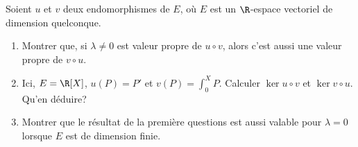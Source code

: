 \begin{enonce}
\begin{exercise}[ID={RMS133 E1283},subtitle={IMT MP 2022},tags={},difficulty={}]
Soient $u$ et $v$ deux endomorphismes de $E$, où $E$ est un $\R$-espace vectoriel de dimension quelconque.
\begin{enumerate}
  \item Montrer que, si $\lambda\neq 0$ est valeur propre de $u\circ v$, alors c'est aussi une valeur propre de $v\circ u$.

  \item Ici, $E=\R[X]$, $u(P)=P'$ et $v(P)=\int_0^X P$.
    Calculer $\ker u\circ v$ et $\ker v\circ u$.
    Qu'en déduire?

  \item Montrer que le résultat de la première questions est aussi valable pour $\lambda=0$ lorsque $E$ est de dimension finie.
\end{enumerate}
\end{exercise}
\begin{solution}
\end{solution}
\end{enonce}
